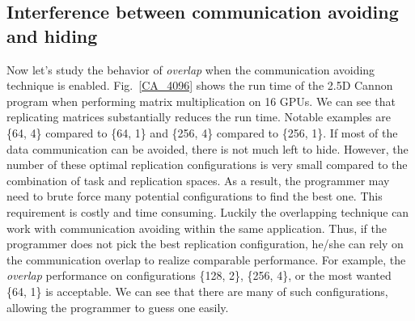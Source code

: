\subsection{Interference between communication avoiding and hiding}
\label{subsec:CAvsOlap}
Now let's study the behavior of {\em overlap} when the communication avoiding technique is enabled.
Fig.~\ref{CA_4096} shows the run time of the 2.5D Cannon program when performing matrix multiplication on 16 GPUs.
We can see that replicating matrices substantially reduces the run time.
Notable examples are  \{64, 4\} compared to \{64, 1\} and \{256, 4\} compared to \{256, 1\}.
If most of the data communication can be avoided, there is not much left to hide.
However, the number of these optimal replication configurations is very small compared to the combination of task and replication spaces.
As a result, the programmer may need to brute force many potential configurations to find the best one.
This requirement is costly and time consuming.
Luckily the overlapping technique can work with communication avoiding within the same application.
Thus, if the programmer does not pick the best replication configuration, he/she can rely on the communication overlap to realize comparable performance.
For example, the {\em overlap} performance on configurations \{128, 2\}, \{256, 4\}, or the most wanted \{64, 1\} is  acceptable. 
We can see that there are many of such configurations, allowing the programmer to guess one easily.

